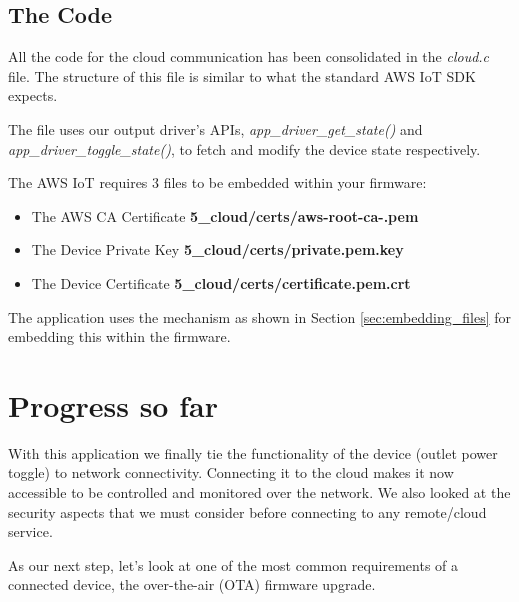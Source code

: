 \documentclass[main.tex]{subfiles}
\begin{document}
\subsection{The Code}
All the code for the cloud communication has been consolidated in the \textit{cloud.c} file. The structure of this file is similar to what the standard AWS IoT SDK expects.

The file uses our output driver's APIs, \textit{app\_driver\_get\_state()} and \textit{app\_driver\_toggle\_state()}, to fetch and modify the device state respectively.

The AWS IoT requires 3 files to be embedded within your firmware:
\begin{itemize}
        \item The AWS CA Certificate  \textbf{5\_cloud/certs/aws-root-ca-.pem}
        \item The Device Private Key  \textbf{5\_cloud/certs/private.pem.key}
        \item The Device Certificate  \textbf{5\_cloud/certs/certificate.pem.crt}
\end{itemize}
The application uses the mechanism as shown in Section \ref{sec:embedding_files} for embedding this within the firmware.

\section{Progress so far}
With this application we finally tie the functionality of the device (outlet power toggle) to network connectivity. Connecting it to the cloud makes it now accessible to be controlled and monitored over the network. We also looked at the security aspects that we must consider before connecting to any remote/cloud service.

As our next step, let's look at one of the most common requirements of a connected device, the over-the-air (OTA) firmware upgrade.
\end{document}
